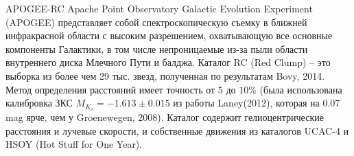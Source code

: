 \documentclass{beamer}
\begin{document}
\begin{frame}{APOGEE-RC}
        Apache Point Observatory Galactic Evolution Experiment (APOGEE) представляет собой спектроскопическую съемку в ближней инфракрасной области с высоким разрешением, охватывающую все основные компоненты Галактики, в том числе непроницаемые из-за пыли области внутреннего диска Млечного Пути и балджа. Каталог RC (Red Clump)  -- это выборка из более чем 29 тыс. звезд, полученная по результатам Bovy, 2014. Метод определения расстояний имеет точность от $5$ до $10\%$ (была использована калибровка ЗКС $M_{K_s} = -1.613 \pm 0.015 $ из работы Laney(2012), которая на 0.07 mag ярче, чем у Groenewegen, 2008). Каталог содержит гелиоцентрические расстояния и лучевые скорости, и собственные движения из каталогов UCAC-4 и HSOY (Hot Stuff for One Year). 
\end{frame}
\end{document}
